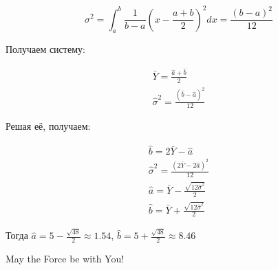 \documentclass[addpoints, answers]{exam} %
\begin{document}
\begin{questions}
\begin{parts}
\begin{solution}
\[
  \sigma^2 = \int_a^b \frac{1}{b-a} \left(x-\frac{a+b}{2}\right)^2 dx = \frac{(b-a)^2}{12}
\]

Получаем систему:

\[
  \begin{array}{l}
	\bar Y = \frac{\hat a+ \hat b}{2} \\
	\hat\sigma^2 = \frac{(\hat b- \hat a)^2}{12}
  \end{array}
\]

Решая её, получаем:

\[
	\begin{array}{l}
	\hat b = 2 \bar Y - \hat a \\
	\hat\sigma^2 = \frac{(2 \bar Y-2\hat a)^2}{12} \\
	\hat a = \bar Y - \frac{\sqrt{12 \hat\sigma^2}}{2} \\
	\hat b = \bar Y + \frac{\sqrt{12 \hat\sigma^2}}{2}
  \end{array}
\]

Тогда $\hat{a} = 5 - \frac{\sqrt{48}}{2} \approx 1.54$, $\hat{b} = 5 + \frac{\sqrt{48}}{2} \approx 8.46$

\end{solution}


\end{parts}





\end{questions}


\begin{flushright}
May the Force be with You!
\end{flushright}
\end{document}
